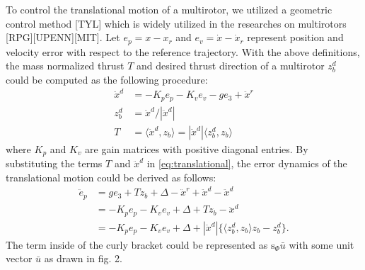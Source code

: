 \documentclass[letterpaper, 10 pt, conference]{ieeeconf}  %
\begin{document}
To control the translational motion of a multirotor, we utilized a geometric control method [TYL] which is widely utilized in the researches on multirotors [RPG][UPENN][MIT].
Let $e_p = x - x_r$ and $e_v = \dot{x} - \dot{x}_r$ represent position and velocity error with respect to the reference trajectory.
With the above definitions, the mass normalized thrust $T$  and desired thrust direction of a multirotor $z_b^d$ could be computed as the following procedure:
\begin{align}
\ddot{x}^{d} &= -K_p e_p - K_v e_v -ge_3 + \ddot{x}^r \nonumber \\
z_b^{d} &= \ddot{x}^{d}/|\ddot{x}^{d}| \nonumber \\
T &= \langle \ddot{x}^{d}, z_b \rangle = |\ddot{x}^{d}|\langle z_b^d, z_b \rangle \nonumber 
\end{align}
where $K_p$ and $K_v$ are gain matrices with positive diagonal entries.
By substituting the terms $T$ and $\ddot{x}^d$ in \eqref{eq:translational}, the error dynamics of the translational motion could be derived as follows:
\begin{align}
\ddot{e}_p &= ge_3 + Tz_b + \Delta - \ddot{x}^r + \ddot{x}^d - \ddot{x}^d \nonumber \\
&= -K_pe_p -K_ve_v + \Delta + Tz_b - \ddot{x}^d \nonumber \\
&= -K_pe_p -K_ve_v + \Delta + |\ddot{x}^d|\{\langle z_b^d, z_b \rangle z_b - z_b^d\}. \label{eq:translationalError1}
\end{align}
The term inside of the curly bracket could be represented as $\text{s}_\Phi \bar{u}$ with some unit vector $\bar{u}$ as drawn in fig. 2.
\end{document}
